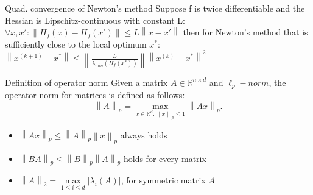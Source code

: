 \documentclass[a4paper]{article}
\begin{document}
\begin{subbox}{Quad. convergence of Newton's method}
    Suppose f is twice differentiable and the Hessian is Lipschitz-continuous with constant L:
    $\forall x, x': \left\lVert H_f(x) - H_f(x')\right\rVert \leq L\left\lVert x-x'\right\rVert $ 
    then for Newton's method that is sufficiently close to the local optimum $x^*$:
    $\left\lVert x^{(k+1)} - x^*\right\rVert \leq \left\lVert \frac{L}{\lambda_{min}(H_f(x^*))}
    \right\rVert \left\lVert x^{(k)} - x^*\right\rVert^2 $  
    
\end{subbox}

\begin{subbox}{Definition of operator norm}
    Given a matrix $A\in \mathbb{R}^{n \times d}$ and $\ell_p - norm$, the operator norm for matrices is defined as follows: 
    \[
    \left\lVert A\right\rVert_p = \underset{x\in \mathbb{R}^d: \left\lVert x\right\rVert_p \leq 1}{\max}\left\lVert Ax\right\rVert_p
    .\] 
\end{subbox}
\begin{itemize}
    \item $\left\lVert Ax\right\rVert_p \leq \left\lVert A\right\rVert_p \left\lVert x\right\rVert_p$ always holds
    \item $\left\lVert BA\right\rVert_p \leq \left\lVert B\right\rVert_p \left\lVert A\right\rVert_p$ holds for every matrix 
    \item $\left\lVert A\right\rVert_2 = \underset{1 \leq i \leq d}{\max} |\lambda_i(A)|$, for symmetric matrix $A$  
\end{itemize}
\end{document}
